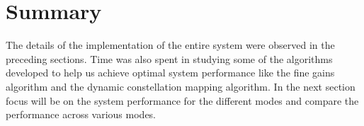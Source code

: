 \section*{Summary}
The details of the implementation of the entire system were observed in the preceding sections. Time was also spent in studying some of the algorithms developed to help us achieve optimal system performance like the fine gains algorithm and the dynamic constellation mapping algorithm. In the next section focus will be on the system performance for the different modes and compare the performance across various modes.

